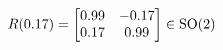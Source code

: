 \documentclass[preview]{standalone}
\begin{document}
\begin{align*}
\special{dvisvgm:raw <g id='unique000'>}R(0.17) = \begin{bmatrix} 0.99 & -0.17 \\ 0.17 & 0.99 \end{bmatrix} \in \text{SO}(2)\special{dvisvgm:raw </g>}
\end{align*}
\end{document}
